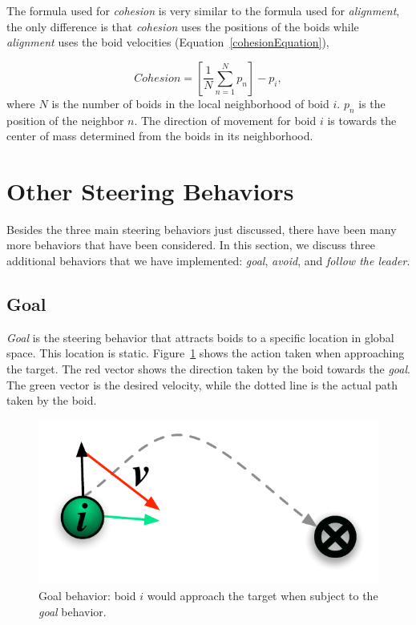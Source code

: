 The formula used for \textit{cohesion} is very similar to the formula used for \textit{alignment}, the only difference is that \textit{cohesion} uses the positions of the boids while \textit{alignment} uses the boid velocities (Equation~\ref{cohesionEquation}),

\begin{equation}
\label{cohesionEquation}
Cohesion = \left[  \frac{1}{N} \sum_{n=1}^{N} p_n \right ] - p_i, 
\end{equation}
where $N$ is the number of boids in the local neighborhood of boid $i$. $p_n$ is the position of the neighbor $n$. The direction of movement for boid $i$ is towards the center of mass determined from the boids in its neighborhood. 

\section{Other Steering Behaviors}\label{otherbehaviors}
Besides the three main steering behaviors just discussed, there have been many more behaviors that have been considered. In this section, we discuss three additional behaviors that we have implemented: \textit{goal}, \textit{avoid}, and \textit{follow the leader}.

\subsection{Goal}
\textit{Goal} is the steering behavior that attracts boids to a specific location in global space. This location is static. Figure~\ref{goalPDF} shows the action taken when approaching the target. The red vector shows the direction taken by the boid towards the \textit{goal}. The green vector is the desired velocity, while the dotted line is the actual path taken by the boid.

\begin{figure}[htbp]
\begin{center}
\includegraphics[scale=0.95]{figures/goal.pdf}
\caption{Goal behavior: boid $i$ would approach the target when subject to the \textit{goal} behavior.}
\label{goalPDF}
\end{center}
\end{figure}

